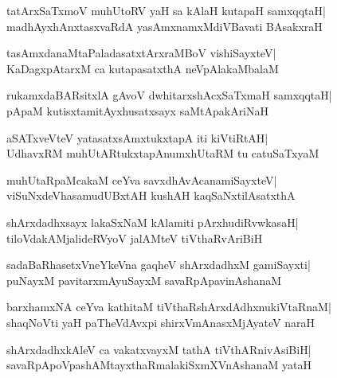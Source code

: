 \documentclass[twoside,12pt,openright]{book}
\newcounter{shloka}[chapter]
\begin{document}
\begin{shloka}%
tatArxSaTxmoV muhUtoRV yaH sa kAlaH kutapaH samxqqtaH|\\
madhAyxhAnxtasxvaRdA yasAmxnamxMdiVBavati BAsakxraH
\end{shloka}

\begin{shloka}%
tasAmxdanaMtaPaladasatxtArxraMBoV vishiSayxteV|\\
KaDagxpAtarxM ca kutapasatxthA neVpAlakaMbalaM
\end{shloka}

\begin{shloka}%
rukamxdaBARsitxlA gAvoV dwhitarxshAcxSaTxmaH samxqqtaH|\\
pApaM kutisxtamitAyxhusatxsayx saMtApakAriNaH
\end{shloka}

\begin{shloka}%
aSATxveVteV yatasatxsAmxtukxtapA iti kiVtiRtAH|\\
UdhavxRM muhUtARtukxtapAnumxhUtaRM tu catuSaTxyaM 
\end{shloka}

\begin{shloka}%
muhUtaRpaMcakaM ceYva savxdhAvAcanamiSayxteV|\\
viSuNxdeVhasamudUBxtAH kushAH kaqSaNxtilAsatxthA
\end{shloka}

\begin{shloka}%
shArxdadhxsayx lakaSxNaM kAlamiti pArxhudiRvwkasaH|\\
tiloVdakAMjalideRVyoV jalAMteV tiVthaRvAriBiH
\end{shloka}

\begin{shloka}%
sadaBaRhasetxVneYkeVna gaqheV shArxdadhxM gamiSayxti|\\
puNayxM pavitarxmAyuSayxM savaRpApavinAshanaM
\end{shloka}

\begin{shloka}%
barxhamxNA ceYva kathitaM tiVthaRshArxdAdhxnukiVtaRnaM|\\
shaqNoVti yaH paTheVdAvxpi shirxVmAnasxMjAyateV naraH
\end{shloka}

\begin{shloka}%
shArxdadhxkAleV ca vakatxvayxM tathA tiVthARnivAsiBiH|\\
savaRpApoVpashAMtayxthaRmalakiSxmXVnAshanaM yataH
\end{shloka}
\end{document}
